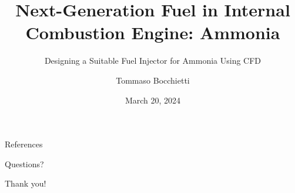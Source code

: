 \documentclass[9pt]{beamer}
\title{Next-Generation Fuel in Internal Combustion Engine: Ammonia}
\subtitle{Designing a Suitable Fuel Injector for Ammonia Using CFD}
\date{March 20, 2024}
\author{Tommaso Bocchietti}
\institute{University of Waterloo}
\begin{document}
\maketitle






% 

\begin{frame}[allowframebreaks]{References}
    \nocite{*}
    
    
\end{frame}

\begin{frame}[standout]
    Questions?
\end{frame}

\begin{frame}[standout]
    Thank you!
\end{frame}
\end{document}
